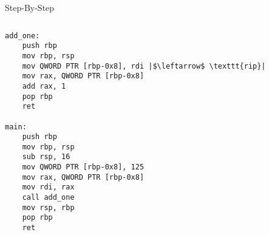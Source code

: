 \documentclass[hyphens,aspectratio=169]{beamer}
\begin{document}
\begin{frame}[fragile]{Step-By-Step}
    \begin{columns}
        \begin{column}{0.33\textwidth}
            \begin{verbatim}
add_one:
    push rbp
    mov rbp, rsp
    mov QWORD PTR [rbp-0x8], rdi |$\leftarrow$ \texttt{rip}|
    mov rax, QWORD PTR [rbp-0x8]
    add rax, 1
    pop rbp
    ret

main:
    push rbp
    mov rbp, rsp
    sub rsp, 16
    mov QWORD PTR [rbp-0x8], 125
    mov rax, QWORD PTR [rbp-0x8]
    mov rdi, rax
    call add_one
    mov rsp, rbp
    pop rbp
    ret
            \end{verbatim}
        \end{column}
        \begin{column}{0.33\textwidth}
\end{column}
\end{columns}
\end{frame}
\end{document}
